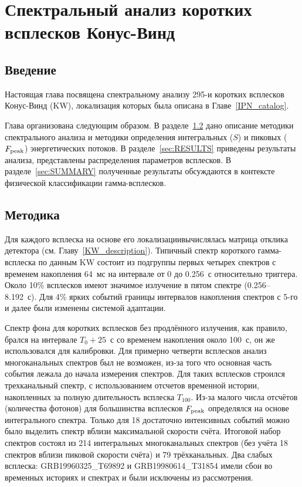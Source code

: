 \chapter{Спектральный анализ коротких всплесков Конус-Винд} \label{sGRB_spectral_catalog}
\section{Введение}
Настоящая глава посвящена спектральному анализу 295-и коротких всплесков Конус-Винд (KW),
локализация которых была описана в Главе~\ref{IPN_catalog}. 


Глава организована следующим образом.
В разделе~\ref{sec:DATA ANALYSIS} дано описание методики спектрального анализа и
методики определения интегральных ($S$) и пиковых ($F_{\mathrm{peak}}$) энергетических потоков.
В разделе~\ref{sec:RESULTS} приведены результаты анализа, представлены распределения параметров всплесков.
В разделе~\ref{sec:SUMMARY} полученные результаты обсуждаются в контексте физической 
классификации гамма-всплесков.

\section{Методика}\label{sec:DATA ANALYSIS}
Для каждого всплеска на основе его локализации\footnotemark вычислялась матрица отклика детектора
(см. Главу~\ref{KW_description}).
Типичный спектр короткого гамма-всплеска по данным KW состоит из подгруппы первых 
четырех спектров с временем накопления 64~мс на интервале 
от 0 до 0.256~с относительно триггера. Около 10\% всплесков имеют значимое 
излучение в пятом спектре (0.256--8.192~с). Для 4\% ярких событий
границы интервалов накопления спектров с 5-го и далее были изменены системой адаптации.


Спектр фона для коротких всплесков без продлённого излучения, как правило, 
брался на интервале $T_0+25$~с со временем накопления около 100~с, он же использовался для калибровки.
Для примерно четверти всплесков анализ многоканальных спектров был не возможен, из-за того 
что основная часть события лежала до начала измерения спектров. 
Для таких всплесков строился трехканальный спектр, с использованием отсчетов временной истории, 
накопленных за полную длительность всплеска $T_{100}$.
Из-за малого числа отсчётов (количества фотонов) для большинства всплесков 
$F_{\mathrm{peak}}$ определялся на основе интегрального спектра. 
Только для 18 достаточно интенсивных событий можно было выделить спектр вблизи 
максимальной скорости счёта.
Итоговой набор спектров состоял из 214 интегральных многоканальных спектров 
(без учёта 18 спектров вблизи пиковой скорости счёта) и 79 трёхканальных. 
Два слабых всплеска: GRB19960325\_T69892 и GRB19980614\_T31854 имели сбои во 
временных историях и спектрах и были исключены из рассмотрения.

